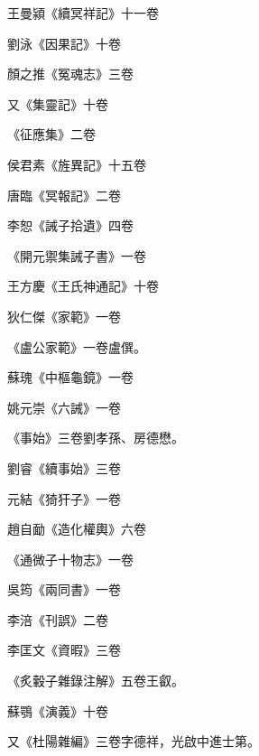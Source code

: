 \begin{pinyinscope}
 王曼潁《續冥祥記》十一卷



 劉泳《因果記》十卷



 顏之推《冤魂志》三卷



 又《集靈記》十卷



 《征應集》二卷



 侯君素《旌異記》十五卷



 唐臨《冥報記》二卷



 李恕《誡子拾遺》四卷



 《開元禦集誡子書》一卷



 王方慶《王氏神通記》十卷



 狄仁傑《家範》一卷



 《盧公家範》一卷盧僎。



 蘇瑰《中樞龜鏡》一卷



 姚元崇《六誡》一卷



 《事始》三卷劉孝孫、房德懋。



 劉睿《續事始》三卷



 元結《猗犴子》一卷



 趙自勔《造化權輿》六卷



 《通微子十物志》一卷



 吳筠《兩同書》一卷



 李涪《刊誤》二卷



 李匡文《資暇》三卷



 《炙轂子雜錄注解》五卷王叡。



 蘇鶚《演義》十卷



 又《杜陽雜編》三卷字德祥，光啟中進士第。




\end{pinyinscope}
